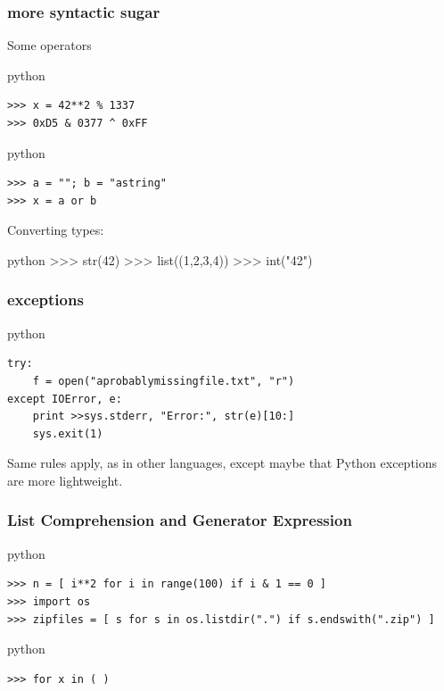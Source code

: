 \documentclass{beamer}
\begin{document}
\begin{frame}[fragile]
	\frametitle{more syntactic sugar}

	Some operators
	\begin{exampleblock}{python}
	\begin{lstlisting}
>>> x = 42**2 % 1337
>>> 0xD5 & 0377 ^ 0xFF
	\end{lstlisting}
	\end{exampleblock}	
	
	\begin{exampleblock}{python}
	\begin{lstlisting}
>>> a = ""; b = "astring"
>>> x = a or b
	\end{lstlisting}
	\end{exampleblock}
	
	Converting types:
	\begin{exampleblock}{python}
>>> str(42)
>>> list((1,2,3,4))
>>> int("42")	
	\end{exampleblock}
\end{frame}

\begin{frame}[fragile]
	\frametitle{exceptions}
	\begin{exampleblock}{python}
	\begin{lstlisting}
try:
	f = open("aprobablymissingfile.txt", "r")
except IOError, e:
	print >>sys.stderr, "Error:", str(e)[10:]
	sys.exit(1)
	\end{lstlisting}
	\end{exampleblock}
	
	Same rules apply, as in other languages, except maybe that Python exceptions are more lightweight.
	

\end{frame}


\begin{frame}
	\frametitle{List Comprehension and Generator Expression}
	\begin{exampleblock}{python}
	\begin{lstlisting}
>>> n = [ i**2 for i in range(100) if i & 1 == 0 ]
>>> import os
>>> zipfiles = [ s for s in os.listdir(".") if s.endswith(".zip") ]
	\end{lstlisting}
	\end{exampleblock}
	
	\begin{exampleblock}{python}
	\begin{lstlisting}
>>> for x in ( )
	\end{lstlisting}
	\end{exampleblock}
\end{frame}
\end{document}
